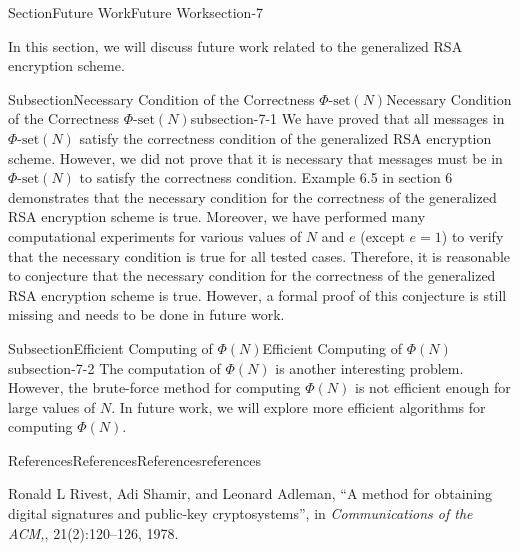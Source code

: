\documentclass[oneside,12pt,]{article}
\newcommand{\pubtitle}[1]{\textsl{#1}}
\numberwithin{equation}{section}
\begin{document}
\begin{sectionptx}{Section}{Future Work}{}{Future Work}{}{}{section-7}
\begin{introduction}{}%
In this section, we will discuss future work related to the generalized RSA encryption scheme.%
\end{introduction}%
%
%
\typeout{************************************************}
\typeout{************************************************}
%
\begin{subsectionptx}{Subsection}{Necessary Condition of the Correctness \(\Phi\text{-set}(N)\)}{}{Necessary Condition of the Correctness \(\Phi\text{-set}(N)\)}{}{}{subsection-7-1}
We have proved that all messages in \(\Phi\text{-set}(N)\) satisfy the correctness condition of the generalized RSA encryption scheme. However, we did not prove that it is necessary that messages must be in \(\Phi\text{-set}(N)\) to satisfy the correctness condition. Example 6.5 in section 6 demonstrates that the necessary condition for the correctness of the generalized RSA encryption scheme is true. Moreover, we have performed many computational experiments for various values of \(N\) and \(e\) (except \(e = 1\)) to verify that the necessary condition is true for all tested cases. Therefore, it is reasonable to conjecture that the necessary condition for the correctness of the generalized RSA encryption scheme is true. However, a formal proof of this conjecture is still missing and needs to be done in future work.%
\end{subsectionptx}
%
%
\typeout{************************************************}
\typeout{************************************************}
%
\begin{subsectionptx}{Subsection}{Efficient Computing of \(\Phi(N)\)}{}{Efficient Computing of \(\Phi(N)\)}{}{}{subsection-7-2}
The computation of \(\Phi(N)\) is another interesting problem. However, the brute-force method for computing \(\Phi(N)\) is not efficient enough for large values of \(N\). In future work, we will explore more efficient algorithms for computing \(\Phi(N)\).%
\end{subsectionptx}
\end{sectionptx}
%
%
\typeout{************************************************}
\typeout{************************************************}
%
\begin{references-section}{References}{References}{}{References}{}{}{references}
\begin{referencelist}
\label{RSA78}{}\hypertarget{RSA78}{}Ronald L Rivest, Adi Shamir, and Leonard Adleman, ``A method for obtaining digital signatures and public-key cryptosystems'', in \pubtitle{Communications of the ACM,}, 21(2):120–126, 1978.
\end{referencelist}
\end{references-section}
\end{document}
